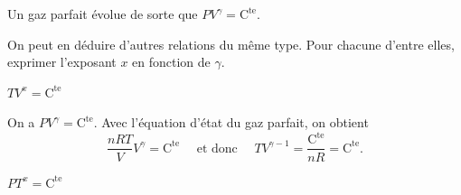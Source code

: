 







\hauteurLargeurCadreReponse		{7mm}{3cm}
\typeEntrainement				{} %
\initialisationEntrainement

Un gaz parfait évolue de sorte que $PV^\gamma=\mathrm{C^{te}}$.

On peut en déduire d'autres relations du même type. Pour chacune d'entre elles, exprimer l'exposant $x$ en fonction de $\gamma$.

\debutEntrainement


\begin{enonce}
$TV^x=\mathrm{C^{te}}$
\end{enonce}


\begin{corrige}
On a $PV^\gamma=\mathrm{C^{te}}$. Avec l'équation d'état du gaz parfait, on obtient
\[
\frac{nRT}{V}V^\gamma=\mathrm{C^{te}}
\quad\text{ et donc }\quad
TV^{\gamma-1}=\frac{\mathrm{C^{te}}}{nR}=\mathrm{C^{te}}.
\]
\end{corrige}


\begin{enonce}
$PT^x=\mathrm{C^{te}}$
\end{enonce}

